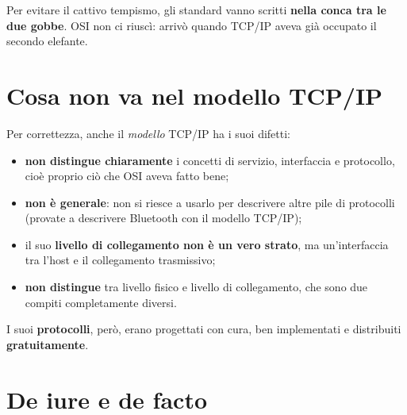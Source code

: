 Per evitare il cattivo tempismo, gli standard vanno scritti \textbf{nella conca tra le due gobbe}.
OSI non ci riuscì: arrivò quando TCP/IP aveva già occupato il secondo elefante.

\section{Cosa non va nel modello TCP/IP}

Per correttezza, anche il \emph{modello} TCP/IP ha i suoi difetti:

\begin{itemize}
    \item \textbf{non distingue chiaramente} i concetti di servizio, interfaccia e protocollo, cioè
          proprio ciò che OSI aveva fatto bene;
    \item \textbf{non è generale}: non si riesce a usarlo per descrivere altre pile di protocolli
          (provate a descrivere Bluetooth con il modello TCP/IP);
    \item il suo \textbf{livello di collegamento non è un vero strato}, ma un'interfaccia tra l'host e il
          collegamento trasmissivo;
    \item \textbf{non distingue} tra livello fisico e livello di collegamento, che sono due compiti
          completamente diversi.
\end{itemize}

I suoi \textbf{protocolli}, però, erano progettati con cura, ben implementati e distribuiti
\textbf{gratuitamente}.

\section{De iure e de facto}

